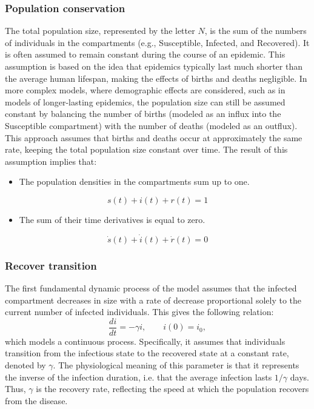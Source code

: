 \subsubsection{Population conservation}
The total population size, represented by the letter $N$, is the sum of the numbers of individuals in the compartments (e.g., Susceptible, Infected, and Recovered). It is often assumed to remain constant during the course of an epidemic. This assumption is based on the idea that epidemics typically last much shorter than the average human lifespan, making the effects of births and deaths negligible.
In more complex models, where demographic effects are considered, such as in models of longer-lasting epidemics, the population size can still be assumed constant by balancing the number of births (modeled as an influx into the Susceptible compartment) with the number of deaths (modeled as an outflux). This approach assumes that births and deaths occur at approximately the same rate, keeping the total population size constant over time. The result of this assumption implies that:
\begin{itemize}
	\item The population densities in the compartments sum up to one.
\end{itemize}
\[s(t) + i(t) + r(t)= 1 \]
\begin{itemize}
	\item The sum of their time derivatives is equal to zero.
\end{itemize}
 \[\dot{s}(t)+ \dot{i}(t) + \dot{r}(t)= 0\]

\subsubsection{Recover transition} 
The first fundamental dynamic process of the model assumes that the infected compartment decreases in size with a rate of decrease proportional solely to the current number of infected individuals. This gives the following relation:
\[\frac{d i}{dt} = - \gamma i, \qquad i(0) = i_0, \]
which models a continuous process. Specifically, it assumes that individuals transition from the infectious state to the recovered state at a constant rate, denoted by $\gamma$. The physiological meaning of this parameter is that it represents the inverse of the infection duration, i.e. that the average infection lasts $1/\gamma$ days. Thus, $\gamma$ is the recovery rate, reflecting the speed at which the population recovers from the disease.
 
